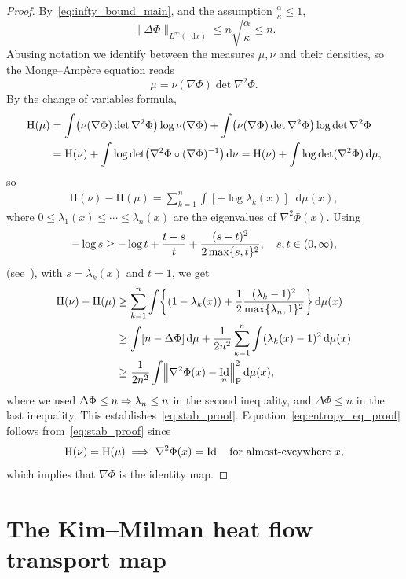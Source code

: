 \documentclass[AHL,Unicode,longabstracts]{cedram}
\DeclareMathOperator{\Id}{Id}
\newcommand{\Ent}{\mathrm H}
\newcommand{\dd}{n}
\newcommand{\source}{\mu}
\newcommand{\target}{\nu}
\newcommand{\lsh}{\alpha}
\newcommand{\lc}{\kappa}
\newcommand*\diff{\mathop{}\!\mathrm{d}}
\newcommand{\OT}{\Phi}
\renewcommand*{\implies}{\mathchoice{\Longrightarrow}{\Rightarrow}{\Rightarrow}{\Rightarrow}}
\let\originalleft\left
\let\originalright\right
\renewcommand{\left}{\mathopen{}\mathclose\bgroup\originalleft}
\renewcommand{\right}{\aftergroup\egroup\originalright}
\let\oldin\in
\renewcommand{\in}{\mathchoice{\oldin}{\oldin}{\,\oldin\,}{\,\oldin\,}}
\begin{document}
\begin{proof}
By~\eqref{eq:infty_bound_main}, and the assumption $\frac{\lsh}{\lc}\le 1$,
\[
\|\Delta\OT\|_{L^{\infty}(\diff x)}\le \dd\sqrt{ \frac{\lsh}{\lc}}\le \dd.
\]
Abusing notation we identify between the measures $\source,\target$ and their densities, so the Monge--Ampère equation reads
\[
\source=\target(\nabla\OT)\det\nabla^2\OT.
\]
By the change of variables formula,
\begin{align*}
\Ent(\source) &=\int \left(\target(\nabla\OT)\det\nabla^2\OT\right)\log \target(\nabla\OT)+\int \left(\target(\nabla\OT)\det\nabla^2\OT\right)\log \det\nabla^2\OT\nonumber\\
&=\Ent(\target)+\int \log \det\left(\nabla^2\OT \circ(\nabla\OT)^{-1}\right)\diff \target=\Ent(\target)+\int \log \det(\nabla^2\OT)\diff \source,
\end{align*}
so
\begin{align*}
\Ent(\target)-\Ent(\source) =\sum_{k=1}^{\dd}\int [-\log \lambda_k(x)]\diff \source(x),
\end{align*}
where $0\le \lambda_1(x)\le\cdots\le \lambda_{\dd}(x)$ are the eigenvalues of $\nabla^2\OT(x)$. Using
\begin{align*}
-\log s\ge -\log t+\frac{t-s}{t}+\frac{(s-t)^2}{2\max\{s,t\}^2},\quad s,t\in (0,\infty),
\end{align*}
(see~\cite[Proof of Lemma~2.5]{MR2672283}), with $s=\lambda_k(x)$ and $t=1$, we get
\begin{align*}
\Ent(\target)-\Ent(\source) &\ge \sum_{k=1}^{\dd}\int \left\{(1-\lambda_k(x))+\frac{1}{2}\frac{(\lambda_k-1)^2}{\max\{\lambda_{\dd},1\}^2}\right\}\diff \source(x)\\
&\ge \int \left[\dd-\Delta\OT \right]\diff \source+ \frac{1}{2\dd^2}\sum_{k=1}^{\dd}\int(\lambda_k(x)-1)^2\diff \source(x)\\
&\ge \frac{1}{2\dd^2}\int\left\|\nabla^2\OT(x) -\Id_{\dd}\right\|_{\text{F}}^2\diff \source(x),
\end{align*}
where we used $\Delta \OT\le \dd\implies \lambda_{\dd}\le \dd$ in the second inequality, and $\Delta \OT\le \dd$ in the last inequality. This establishes~\eqref{eq:stab_proof}. Equation~\eqref{eq:entropy_eq_proof} follows from~\eqref{eq:stab_proof} since
\[
\Ent(\target)= \Ent(\source)\;\implies \;\nabla^2\OT(x)=\Id\quad \textnormal{for almost-eveywhere $x$},
\]
which implies that $\nabla\OT$ is the identity map.
\end{proof}



\section{The Kim--Milman heat flow transport map}\label{sec:KM}
\end{document}
